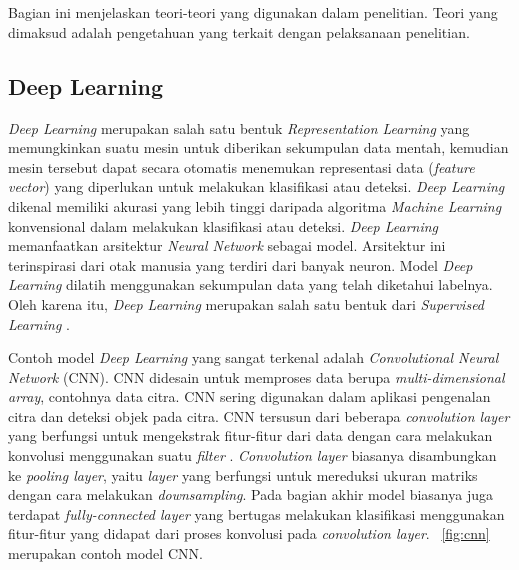 \chapter{\babDua}
Bagian ini menjelaskan teori-teori yang digunakan dalam penelitian. Teori yang dimaksud adalah pengetahuan yang terkait dengan pelaksanaan penelitian.

\section{Deep Learning}
\textit{Deep Learning} merupakan salah satu bentuk \textit{Representation Learning} yang memungkinkan suatu mesin untuk diberikan sekumpulan data mentah, kemudian mesin tersebut dapat secara otomatis menemukan representasi data (\textit{feature vector}) yang diperlukan untuk melakukan klasifikasi atau deteksi. \textit{Deep Learning} dikenal memiliki akurasi yang lebih tinggi daripada algoritma \textit{Machine Learning} konvensional dalam melakukan klasifikasi atau deteksi. \textit{Deep Learning} memanfaatkan arsitektur \textit{Neural Network} sebagai model. Arsitektur ini terinspirasi dari otak manusia yang terdiri dari banyak neuron. Model \textit{Deep Learning} dilatih menggunakan sekumpulan data yang telah diketahui labelnya. Oleh karena itu, \textit{Deep Learning} merupakan salah satu bentuk dari \textit{Supervised Learning} \cite{deeplearning}. 

Contoh model \textit{Deep Learning} yang sangat terkenal adalah \textit{Convolutional Neural Network} (CNN). CNN didesain untuk memproses data berupa \textit{multi-dimensional array}, contohnya data citra. CNN sering digunakan dalam aplikasi pengenalan citra dan deteksi objek pada citra. CNN tersusun dari beberapa \textit{convolution layer} yang berfungsi untuk mengekstrak fitur-fitur dari data dengan cara melakukan konvolusi menggunakan suatu \textit{filter} \cite{deeplearningmatrix}. \textit{Convolution layer} biasanya disambungkan ke \textit{pooling layer}, yaitu \textit{layer} yang berfungsi untuk mereduksi ukuran matriks dengan cara melakukan \textit{downsampling}. Pada bagian akhir model biasanya juga terdapat \textit{fully-connected layer} yang bertugas melakukan klasifikasi menggunakan fitur-fitur yang didapat dari proses konvolusi pada \textit{convolution layer}. \pic~\ref{fig:cnn} merupakan contoh model CNN.

